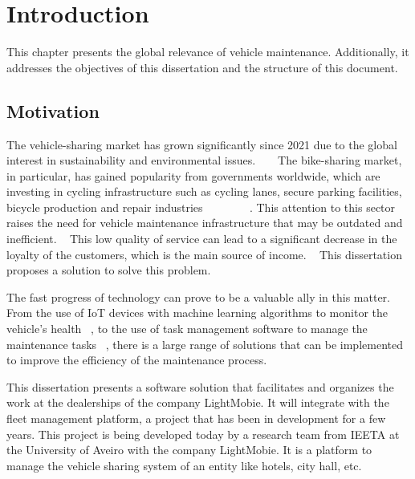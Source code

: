 \chapter{Introduction}%
\label{chapter:introduction}

\begin{introduction}
This chapter presents the global relevance of vehicle maintenance. Additionally, it addresses the objectives of this dissertation and the structure of this document.
\end{introduction} 


\section{Motivation}

The vehicle-sharing market has grown significantly since 2021 due to the global interest in sustainability and environmental issues. ~\cite{cohesionOpenData} ~\cite{bike_data_businessresearch}
The bike-sharing market, in particular, has gained popularity from governments worldwide, which are investing in cycling infrastructure such as cycling lanes, secure parking facilities, bicycle production and repair industries ~\cite{Clercq2023} ~\cite{Cerro2024} ~\cite{European_declararion_on_cycling} ~\cite{bike_data_businessresearch} ~\cite{cohesionOpenData}.
This attention to this sector raises the need for vehicle maintenance infrastructure that may be outdated and inefficient. ~\cite{MAS_MOTORS}
This low quality of service can lead to a significant decrease in the loyalty of the customers, which is the main source of income. ~\cite{Setting_the_after_sale_process}
This dissertation proposes a solution to solve this problem.

The fast progress of technology can prove to be a valuable ally in this matter. 
From the use of IoT devices with machine learning algorithms to monitor the vehicle's health ~\cite{Vasavi2021}, 
to the use of task management software to manage the maintenance tasks ~\cite{MAS_MOTORS}, 
there is a large range of solutions that can be implemented to improve the efficiency of the maintenance process.

This dissertation presents a software solution that facilitates and organizes the work at the dealerships of the company LightMobie. 
It will integrate with the fleet management platform, a project that has been in development for a few years. 
This project is being developed today by a research team from \ac{IEETA} at the University of Aveiro with the company LightMobie.
It is a platform to manage the vehicle sharing system of an entity like hotels, city hall, etc.  


